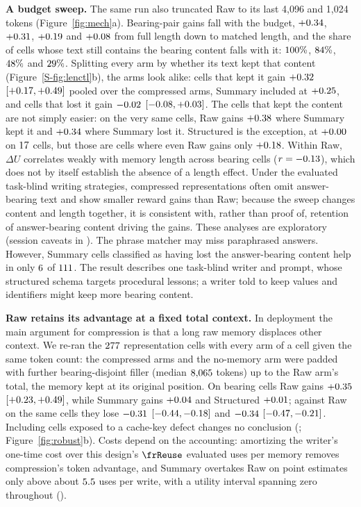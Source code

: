 \textbf{A budget sweep.} The same run also
truncated Raw to its last 4,096 and 1,024 tokens (Figure~\ref{fig:mech}a).
Bearing-pair gains fall with the budget, $+0.34$, $+0.31$, $+0.19$ and $+0.08$
from full length down to matched length, and the share of cells whose text
still contains the bearing content falls with it: $100\%$,
$84\%$, $48\%$ and $29\%$. Splitting every arm by
whether its text kept that content (Figure~\ref*{S-fig:lenctl}b), the arms look
alike: cells that kept it gain $+0.32$ $[+0.17, +0.49]$
pooled over the compressed arms, Summary included at $+0.25$, and cells that
lost it gain $-0.02$ $[-0.08, +0.03]$. The cells that
kept the content are not simply easier: on the very same cells, Raw gains
$+0.38$ where Summary kept it and $+0.34$ where Summary lost it.
Structured is the exception, at $+0.00$ on $17$ cells, but those are
cells where even Raw gains only $+0.18$. Within Raw, $\Delta U$ correlates weakly with memory length across bearing
cells ($r = -0.13$), which does not by itself establish the absence of a
length effect. Under the evaluated task-blind writing strategies, compressed
representations often omit answer-bearing text and show smaller reward gains
than Raw; because the sweep changes content and length together, it is
consistent with, rather than proof of, retention of answer-bearing content
driving the gains. These analyses are
exploratory (session caveats in ). The phrase matcher may miss paraphrased answers. However, Summary cells
classified as having lost the answer-bearing content help in only
$6$ of $111$. The result describes one task-blind writer
and prompt, whose structured schema targets procedural lessons; a writer told to
keep values and identifiers might keep more bearing content.

\textbf{Raw retains its advantage at a fixed total context.} In deployment the main
argument for compression is that a long raw memory displaces other context. We
re-ran the $277$ representation cells with every arm of a cell given
the same token count: the compressed arms and the no-memory arm were padded with
further bearing-disjoint filler (median $8{,}065$ tokens) up to the Raw arm's
total, the memory kept at its original position. On bearing cells Raw gains
$+0.35$ $[+0.23, +0.49]$, while Summary gains $+0.04$ and Structured
$+0.01$; against Raw on the same cells they lose $-0.31$
$[-0.44, -0.18]$ and $-0.34$ $[-0.47, -0.21]$. Including
cells exposed to a cache-key defect changes no conclusion (;
Figure~\ref{fig:robust}b). Costs depend on the accounting: amortizing the
writer's one-time cost over this design's $\frReuse$ evaluated uses per memory
removes compression's token advantage, and Summary overtakes Raw on point
estimates only above about $5.5$ uses per write, with a utility
interval spanning zero throughout ().

